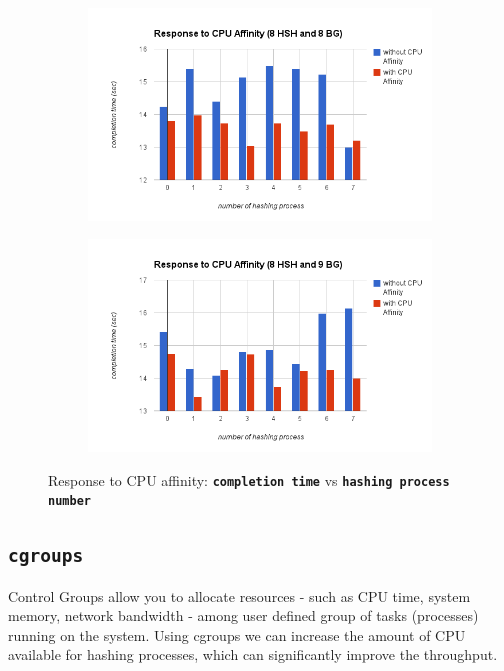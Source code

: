 \documentclass[10pt] {article}
\begin{document}
\begin{figure}[ht!]
\centering
\begin{subfigure}{.5\textwidth}
  \centering
  \includegraphics[width=\linewidth]{./cpu_agg_8_8.png}
  \caption{}
  \label{fig:sub1}
\end{subfigure}%
\begin{subfigure}{.5\textwidth}
  \centering
  \includegraphics[width=\linewidth]{cpu_aff_8_9.png}
  \caption{}
  \label{fig:sub2}
\end{subfigure}
\caption{Response to CPU affinity: \textbf{\texttt{completion time}}  vs  \textbf{\texttt{hashing process number}}}
\label{fig:cpu_affinity}
\end{figure}

\subsection{\texttt{cgroups} }
Control Groups allow you to allocate resources - such as CPU time, system memory, network bandwidth - among user defined group of tasks (processes) running on the system. Using cgroups we can increase the amount of CPU available for hashing processes, which can significantly improve the throughput.
\end{document}
